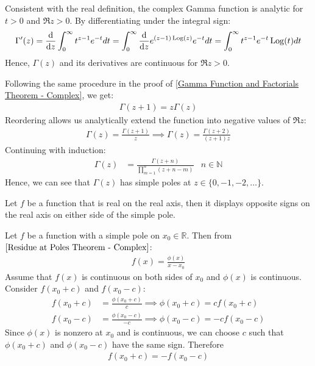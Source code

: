 \documentclass[12pt, english]{book}
\makeatletter
\renewenvironment{proof}[1][\proofname]{\par
	\pushQED{\qed}%
	\normalfont \topsep6\p@\@plus6\p@\relax
	\list{}{%
		\settowidth{\leftmargin}{\itshape\proofname:\hskip\labelsep}%
		\setlength{\labelwidth}{0pt}%
		\setlength{\itemindent}{-\leftmargin}%
	}%
	\item[\hskip\labelsep\itshape#1\@addpunct{:}]\ignorespaces
	}{ \popQED\endlist\@endpefalse}
\makeatother
\begin{document}
	Consistent with the real definition, the complex Gamma function is analytic for \(t>0\) and \(\Re{z}>0\). By differentiating under the integral sign:
	\begin{align*}
		\Gamma '(z) = \dv{z} \int_{0}^{\infty} t^{z-1} e^{-t} dt  
			= \int_{0}^{\infty} \dv{z} e^{(z-1) \operatorname{Log}(z)} e^{-t} dt
			= \int_{0}^{\infty} t^{z-1} e^{-t} \operatorname{Log}(t) dt
	\end{align*}
	Hence, \(\Gamma(z)\) and its derivatives are continuous for \(\Re{z}>0\).
	
	Following the same procedure in the proof of \cref{Gamma Function and Factorials Theorem - Complex}, we get:
	\begin{align*}
		\Gamma(z+1) = z \Gamma(z)
	\end{align*}
	Reordering allows us analytically extend the function into negative values of \(\Re{z}\):
	\begin{align*}
		\Gamma(z) = \frac{\Gamma(z+1)}{z} \implies \Gamma(z) = \frac{\Gamma(z+2)}{(z+1)z}
	\end{align*}
	Continuing with induction:
	\begin{align*}
		\Gamma(z) &= \frac{\Gamma(z+n)}{\prod_{m=1}^{n} (z + n - m)}
			& n \in \mathbb{N}
	\end{align*}
	Hence, we can see that \(\Gamma(z)\) has simple poles at \(z \in \{0, -1, -2, \ldots\}\).
	
	\begin{theorem}
		\label{Function real on real axis implies alternating sign across simple pole on real axis theorem - Complex}
		Let \(f\) be a function that is real on the real axis, then it displays opposite signs on the real axis on either side of the simple pole.
	\end{theorem}
	\begin{proof}
		{\color{Grey}
		Let \(f\) be a function with a simple pole on \(x_0 \in \mathbb{R}\). Then from \(\cref{Residue at Poles Theorem - Complex}\):
		\begin{align*}
			f(x) = \frac{\phi(x)}{x-x_0}
		\end{align*}
		Assume that \(f(x)\) is continuous on both sides of \(x_0\) and \(\phi(x)\) is continuous. Consider \(f(x_0 + c)\) and \(f(x_0 - c)\):
		\begin{align*}
			f(x_0 + c) &= \frac{\phi(x_0 + c)}{c} \implies \phi(x_0 + c) = c f(x_0 + c)\\
			f(x_0 - c) &= \frac{\phi(x_0 - c)}{-c} \implies \phi(x_0 - c) = -c f(x_0 - c)
		\end{align*}
		Since \(\phi(x)\) is nonzero at \(x_0\) and is continuous, we can choose \(c\) such that \(\phi(x_0 + c)\) and \(\phi(x_0 - c)\) have the same sign. Therefore
		\begin{align*}
			f(x_0 + c) = - f(x_0 - c)
		\end{align*}
		}
	\end{proof}
	
\end{document}

